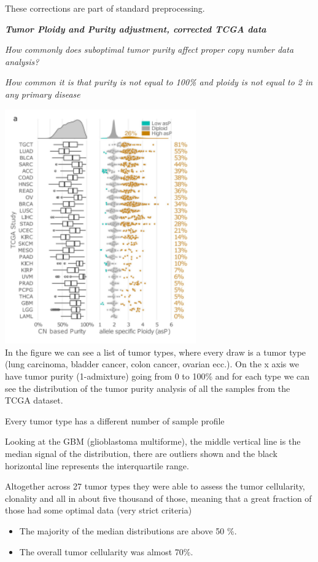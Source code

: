 These corrections are part of standard preprocessing.

\emph{\textbf{Tumor Ploidy and Purity adjustment, corrected TCGA data}}

\emph{How commonly does suboptimal tumor purity affect proper copy number data
analysis?}

\emph{How common it is that purity is not equal to 100\% and ploidy is not equal
to 2 in any primary disease}

\includegraphics[width=3.24375in,height=3.97569in]{image9.png}\\

In the figure we can see a list of tumor types, where every draw is a tumor type
(lung carcinoma, bladder cancer, colon cancer, ovarian ecc.). On the x axis we
have tumor purity (1-admixture) going from 0 to 100\% and for each type we can
see the distribution of the tumor purity analysis of all the samples from the
TCGA dataset.

Every tumor type has a different number of sample profile

Looking at the GBM (glioblastoma multiforme), the middle vertical line is the
median signal of the distribution, there are outliers shown and the black
horizontal line represents the interquartile range.

Altogether across 27 tumor types they were able to assess the tumor cellularity,
clonality and all in about five thousand of those, meaning that a great fraction
of those had some optimal data (very strict criteria)

\begin{itemize}
\item
  The majority of the median distributions are above 50 \%.
\item
  The overall tumor cellularity was almost 70\%.
\end{itemize}

